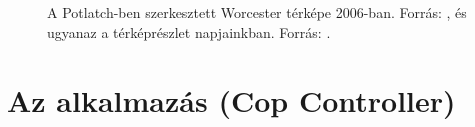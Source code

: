 \documentclass[a4paper,12pt]{report}
\begin{document}
\begin{figure}[h]
\centering
{}
\quad
{}
\caption{A Potlatch-ben szerkesztett Worcester térképe 2006-ban. Forrás: \cite{osmhistory}, és ugyanaz a térképrészlet napjainkban. Forrás: \cite{osm}.}
\end{figure}


\newpage
\chapter{Az alkalmazás (Cop Controller)}
\label{theapp}
\end{document}
